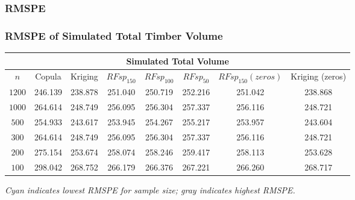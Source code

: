 \documentclass{beamer}
\begin{document}
\subsubsection{RMSPE}
\begin{frame}
	\frametitle{RMSPE of Simulated Total Timber Volume}
	\begin{center}
	\begin{tabular}{|| c | c c c c c c c ||}
	\hline
	\multicolumn{8}{||c||}{Simulated Total Volume} \\
	\hline
	$n$ & Copula & Kriging & $RFsp_{150}$ & $RFsp_{100}$ & $RFsp_{50}$ & $RFsp_{150}(zeros)$ & Kriging (zeros) \\ [.5ex] 
	\hline\hline
	$1200$ & 246.139 & 238.878 & 251.040 & 250.719 & \cellcolor{gray}252.216 & 251.042 & \cellcolor{cyan}238.868 \\
	$1000$ & \cellcolor{gray}264.614 & 248.749 & 256.095 & 256.304 & 257.337 & 256.116 & \cellcolor{cyan}248.721 \\
	$500$ & 254.933 & 243.617 & 253.945 & 254.267 & \cellcolor{gray}255.217 & 253.957 & \cellcolor{cyan}243.604 \\
	$300$ & \cellcolor{gray}264.614 & 248.749 & 256.095 & 256.304 & 257.337 & 256.116 & \cellcolor{cyan}248.721 \\
	$200$ & \cellcolor{gray}275.154 & 253.674 & 258.074 & 258.246 & 259.417 & 258.113 & \cellcolor{cyan}253.628 \\
	$100$ & \cellcolor{gray}298.042 & 268.752 & \cellcolor{cyan}266.179 & 266.376 & 267.221 & 266.260 & 268.717 \\ [.5ex] 
	\hline
	\end{tabular}
	\vspace{.06cm}

	\textit{Cyan indicates lowest RMSPE for sample size; gray indicates highest RMSPE.}
	\end{center}
\end{frame}
\end{document}
